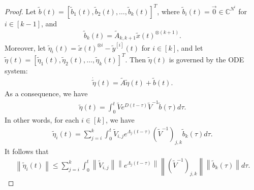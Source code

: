 \documentclass[superscriptaddress,onecolumn,nofootinbib,longbibliography,a4paper,accepted=2026-09-29]{quantumarticle}
\theoremstyle{plain}
\theoremstyle{definition}
\numberwithin{thm}{section}
\numberwithin{assumption}{section}
\numberwithin{lemma}{section}
\numberwithin{prop}{section}
\numberwithin{cor}{section}
\numberwithin{definition}{section}
\numberwithin{rmk}{section}
\numberwithin{equation}{section}
\newcommand{\norm}[1]     {\left\| #1 \right\|}
\newcommand{\myC}{\mathbb{C}}
\newcommand{\lrb}[1]{\left ( #1 \right )}
\begin{document}
\begin{proof}
    Let $\tilde{b}(t)=[\tilde{b}_1(t),\tilde{b}_2(t),\dots,\tilde{b}_k(t)]^T$, where $\tilde{b}_i(t)=\vec 0 \in \myC^{N^i}$ for $i \in [k-1]$, and 
    \begin{align}
    \tilde{b}_k(t)=\tilde{A}_{k,k+1}\tilde{x}(t)^{\otimes (k+1)}.    
    \end{align}
    Moreover, let $\tilde{\eta}_i(t)=\tilde{x}(t)^{\otimes i}-\tilde{y}^{[i]}(t)$ for $i \in [k]$, and let $\tilde{\eta}(t)=[\tilde{\eta}_1(t), \tilde{\eta}_2(t), \dots, \tilde{\eta}_k(t)]^T$. Then $\tilde{\eta}(t)$ is governed by the ODE system:
    \begin{align}
        \dot{\tilde{\eta}}(t) = {\tilde{A} \tilde{\eta}(t)+ \tilde{b}(t)}.
    \end{align}
    As a consequence, we have
    \begin{align}
    \tilde{\eta}(t) =\int_0^t \tilde{V}e^{D(t-\tau)}\tilde{V}^{-1}\tilde{b}(\tau)d\tau.
    \end{align}
    In other words, for each $i \in [k]$, we have
    \begin{align}
    \tilde{\eta}_i(t) = \sum_{j=i}^k \int_0^t \tilde{V}_{i,j} e^{\Lambda_j(t-\tau)} \lrb{\tilde{V}^{-1}}_{j,k} \tilde{b}_k(\tau) 
    d\tau.
    \end{align}
    It follows that
    \begin{align}
    \norm{\tilde{\eta}_i(t)} \le \sum_{j=i}^k \int_0^t \norm{\tilde{V}_{i,j}} \norm{e^{\Lambda_j(t-\tau)}} \norm{\lrb{\tilde{V}^{-1}}_{j,k}} \norm{\tilde{b}_k(\tau)} 
    d\tau.
    \end{align}
    

\end{proof}
\end{document}
